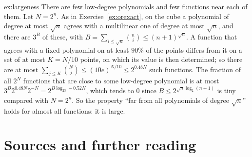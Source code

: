 \begin{solution}{ex:largeness}
\idea There are few low-degree polynomials and few functions near each of them.
\writeup Let $N=2^n$. As in Exercise~\ref{ex:orexact}, on the cube a polynomial of degree at most $\sqrt n$ agrees with a multilinear one of degree at most $\sqrt n$, and there are $3^B$ of these, with $B=\sum_{i\le\sqrt n}\binom ni\le(n+1)^{\sqrt n}$. A function that agrees with a fixed polynomial on at least $90\%$ of the points differs from it on a set of at most $K=N/10$ points, on which its value is then determined; so there are at most $\sum_{j\le K}\binom Nj\le(10e)^{N/10}\le2^{0.48N}$ such functions. The fraction of all $2^N$ functions that are close to some low-degree polynomial is at most $3^B2^{0.48N}2^{-N}=2^{B\log_23-0.52N}$, which tends to $0$ since $B\le2^{\sqrt n\log_2(n+1)}$ is tiny compared with $N=2^n$. So the property ``far from all polynomials of degree $\sqrt n$'' holds for almost all functions: it is large.
\end{solution}

\section*{Sources and further reading}

